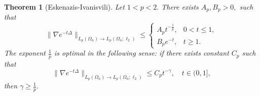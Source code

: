 \documentclass{amsart}
\numberwithin{equation}{section}
\newtheorem{thm}{Theorem}[section]
\theoremstyle{definition}
\theoremstyle{remark}
\newcommand{\1}{\mathbf 1}
\begin{document}
\begin{thm}[Eskenazis-Ivanisvili]\label{thm:heat-smoothing}
Let $1<p<2.$ There exists $A_p,B_p>0,$ such that 
\begin{equation}\label{eq:heat-smoothing}
\|\nabla e^{-t\Delta}\|_{L_p(\Omega_{n})\to L_p(\Omega_{n};\ell_2)}
\leq
\begin{cases}
A_pt^{-\frac1p},&0<t\leq1,\\
B_pe^{-t},&t\geq1.
\end{cases}
\end{equation}
The exponent $\frac1p$ is optimal in the following sense: if there exists constant $C_p$ such that
$$\|\nabla e^{-t\Delta}\|_{L_p(\Omega_{n})\to L_p(\Omega_{n};\ell_2)}\leq C_pt^{-\gamma},\quad t\in(0,1],$$
then $\gamma\geq\frac1p.$
\end{thm}
\end{document}
